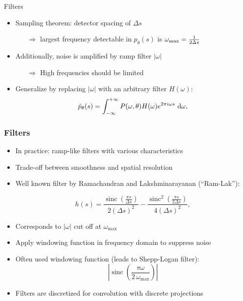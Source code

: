 \begin{frame}[c]{Filters}

	\begin{itemize}
		\setlength\itemsep{0.5cm}
		\item Sampling theorem: detector spacing of $\Delta s$
		      \begin{itemize}
			      \item[$\Rightarrow$] largest frequency detectable in $p_\theta(s)$ is $\omega_{\textnormal{max}} = \frac{1}{2\Delta s}$
		      \end{itemize}
		\item Additionally, noise is amplified by ramp filter $|\omega|$
		      \begin{itemize}
			      \item[$\Rightarrow$] High frequencies should be limited
		      \end{itemize}
		\item Generalize by replacing $|\omega|$ with an arbitrary filter $H(\omega)$:
		      \begin{equation}
			      \tilde{p}_{\theta}(s) = \int_{-\infty}^{+\infty} P(\omega, \theta) H(\omega) e^{2 \pi i \omega s} \ \textnormal d\omega,
		      \end{equation}

	\end{itemize}

\end{frame}

\begin{frame}
	\frametitle{Filters}

	\begin{itemize}
		\item In practice: ramp-like filters with various characteristics
		\item Trade-off between smoothness and spatial resolution
		\item Well known filter by Ramachandran and Lakshminarayanan (``Ram-Lak''):

		      \begin{equation}
			      h(s) = \frac{\operatorname{sinc}\left(\frac{\pi s}{\Delta s}\right)}{2 (\Delta s)^2} - \frac{\operatorname{sinc}^2\left(\frac{\pi s}{2\Delta s}\right)}{4 (\Delta s)^2},
		      \end{equation}

		\item Corresponds to $|\omega|$ cut off at $\omega_\text{max}$

		\item Apply windowing function in frequency domain to suppress noise
		\item Often used windowing function (leads to Shepp-Logan filter):
		      \begin{equation}
			      \left|\operatorname{sinc}\left(\frac{\pi \omega}{2\,\omega_\text{max}}\right)\right|
		      \end{equation}

		\item Filters are discretized for convolution with discrete projections
	\end{itemize}

\end{frame}

